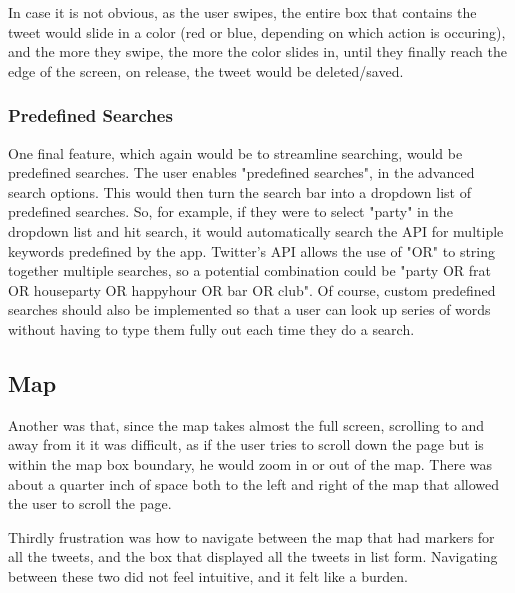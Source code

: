 \documentclass[11pt]{article}
\begin{document}
In case it is not obvious, as the user swipes, the entire box that contains the tweet would slide in a color (red or blue, depending on which action is occuring), and the more they swipe, the more the color slides in, until they finally reach the edge of the screen, on release, the tweet would be deleted/saved.

\subsubsection{Predefined Searches}

One final feature, which again would be to streamline searching, would be predefined searches. The user enables "predefined searches", in the advanced search options. This would then turn the search bar into a dropdown list of predefined searches. So, for example, if they were to select "party" in the dropdown list and hit search, it would automatically search the API for multiple keywords predefined by the app. Twitter's API allows the use of "OR" to string together multiple searches, so a potential combination could be "party OR frat OR houseparty OR happyhour OR bar OR club". Of course, custom predefined searches should also be implemented so that a user can look up series of words without having to type them fully out each time they do a search.






\subsection{Map}
Another was that, since the map takes almost the full screen, scrolling to and away from it it was difficult, as if the user tries to scroll down the page but is within the map box boundary, he would zoom in or out of the map. There was about a quarter inch of space both to the left and right of the map that allowed the user to scroll the page. 



Thirdly frustration was how to navigate between the map that had markers for all the tweets, and the box that displayed all the tweets in list form. Navigating between these two did not feel intuitive, and it felt like a burden.




\end{document}
